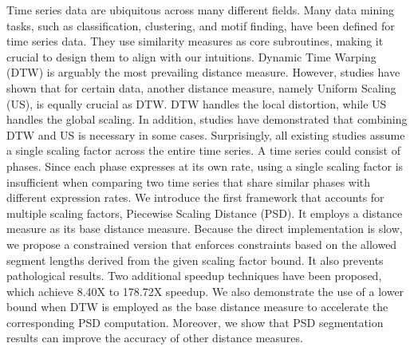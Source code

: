 Time series data are ubiquitous across many different fields.
Many data mining tasks, such as classification, clustering, and motif finding, have been defined for time series data. 
They use similarity measures as core subroutines, making it crucial to design them to align with our intuitions.
%
Dynamic Time Warping (DTW) is arguably the most prevailing distance measure. 
However, studies have shown that for certain data, another distance measure, namely Uniform Scaling (US), is equally crucial as DTW.
%
DTW handles the local distortion, while US handles the global scaling.
In addition, studies have demonstrated that combining DTW and US is necessary in some cases. 
%
Surprisingly, all existing studies assume a single scaling factor across the entire time series.
A time series could consist of phases. 
Since each phase expresses at its own rate, using a single scaling factor is insufficient when comparing two time series that share similar phases with different expression rates.
%
We introduce the first framework that accounts for multiple scaling factors, Piecewise Scaling Distance (PSD).
It employs a distance measure as its base distance measure.
Because the direct implementation is slow, we propose a constrained version that enforces constraints based on the allowed segment lengths derived from the given scaling factor bound.
It also prevents pathological results.
Two additional speedup techniques have been proposed, which achieve 8.40X to 178.72X speedup.
We also demonstrate the use of a lower bound when DTW is employed as the base distance measure to accelerate the corresponding PSD computation.
Moreover, we show that PSD segmentation results can improve the accuracy of other distance measures.